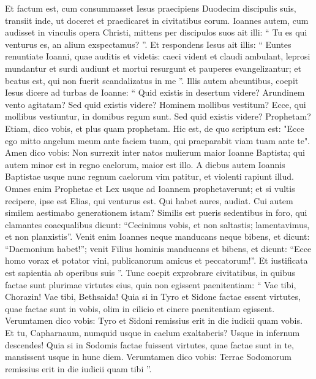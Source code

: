 \begin{biblechapter}
\begin{biblechapter}
\begin{biblechapter}
\begin{biblechapter}
\begin{biblechapter}
\begin{biblechapter}
\begin{biblechapter}
\begin{biblechapter}
\begin{biblechapter}
\begin{biblechapter}
\begin{biblechapter}
\verse Et factum est, cum consummasset Iesus praecipiens Duodecim discipulis suis, transiit inde, ut doceret et praedicaret in civitatibus eorum.
 \verse Ioannes autem, cum audisset in vinculis opera Christi, mittens per discipulos suos 
\verse ait illi: “ Tu es qui venturus es, an alium exspectamus? ”. 
\verse Et respondens Iesus ait illis: “ Euntes renuntiate Ioanni, quae auditis et videtis: 
 \verse caeci vident et claudi ambulant, leprosi mundantur et surdi audiunt et mortui resurgunt et pauperes evangelizantur; 
\verse et beatus est, qui non fuerit scandalizatus in me ”. 
\verse Illis autem abeuntibus, coepit Iesus dicere ad turbas de Ioanne: “ Quid existis in desertum videre? Arundinem vento agitatam? 
 \verse Sed quid existis videre? Hominem mollibus vestitum? Ecce, qui mollibus vestiuntur, in domibus regum sunt. 
\verse Sed quid existis videre? Prophetam? Etiam, dico vobis, et plus quam prophetam.
 \verse Hic est, de quo scriptum est:
 "Ecce ego mitto angelum meum ante faciem tuam,
 qui praeparabit viam tuam ante te".
 \verse Amen dico vobis: Non surrexit inter natos mulierum maior Ioanne Baptista; qui autem minor est in regno caelorum, maior est illo. 
\verse A diebus autem Ioannis Baptistae usque nunc regnum caelorum vim patitur, et violenti rapiunt illud. 
 \verse Omnes enim Prophetae et Lex usque ad Ioannem prophetaverunt; 
\verse et si vultis recipere, ipse est Elias, qui venturus est. 
\verse Qui habet aures, audiat.
 \verse Cui autem similem aestimabo generationem istam? Similis est pueris sedentibus in foro, qui clamantes coaequalibus 
\verse dicunt:
 “Cecinimus vobis, et non saltastis;
 lamentavimus, et non planxistis”.
 \verse Venit enim Ioannes neque manducans neque bibens, et dicunt: “Daemonium habet!”; 
\verse venit Filius hominis manducans et bibens, et dicunt: “Ecce homo vorax et potator vini, publicanorum amicus et peccatorum!”. Et iustificata est sapientia ab operibus suis ”.
 \verse Tunc coepit exprobrare civitatibus, in quibus factae sunt plurimae virtutes eius, quia non egissent paenitentiam: 
\verse “ Vae tibi, Chorazin! Vae tibi, Bethsaida! Quia si in Tyro et Sidone factae essent virtutes, quae factae sunt in vobis, olim in cilicio et cinere paenitentiam egissent. 
\verse Verumtamen dico vobis: Tyro et Sidoni remissius erit in die iudicii quam vobis. 
\verse Et tu, Capharnaum, numquid usque in caelum exaltaberis? Usque in infernum descendes! Quia si in Sodomis factae fuissent virtutes, quae factae sunt in te, mansissent usque in hunc diem. 
\verse Verumtamen dico vobis: Terrae Sodomorum remissius erit in die iudicii quam tibi ”.

\end{biblechapter}
\end{biblechapter}
\end{biblechapter}
\end{biblechapter}
\end{biblechapter}
\end{biblechapter}
\end{biblechapter}
\end{biblechapter}
\end{biblechapter}
\end{biblechapter}
\end{biblechapter}
